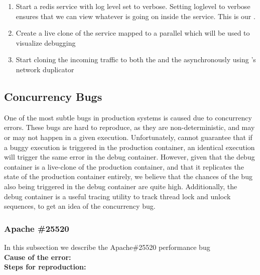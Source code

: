 \begin{adjustwidth}{0.5cm}{}
	\begin{enumerate}
		\item Start a redis service with log level set to verbose. Setting loglevel to verbose ensures that we can view whatever is going on inside the service. This is our \productioncontainer.
		\item Create a live clone of the service mapped to a parallel \debugcontainer which will be used to visualize debugging
		\item Start cloning the incoming traffic to both the \productioncontainer and the \debugcontainer asynchronously using \parikshan's network duplicator
	\end{enumerate}
\end{adjustwidth}



\subsection{Concurrency Bugs}
One of the most subtle bugs in production systems is caused due to concurrency errors.
These bugs are hard to reproduce, as they are non-deterministic, and may or may not happen in a given execution.
Unfortunately, \parikshan cannot guarantee that if a buggy execution is triggered in the production container, an identical execution will trigger the same error in the debug container.
However, given that the debug container is a live-clone of the production container, and that it replicates the state of the production container entirely, we believe that the chances of the bug also being triggered in the debug container are quite high.
Additionally, the debug container is a useful tracing utility to track thread lock and unlock sequences, to get an idea of the concurrency bug.

\subsubsection{Apache \#25520}

In this subsection we describe the Apache\#25520 performance bug \\

\noindent \textbf{Cause of the error:} \\

\noindent \textbf{Steps for reproduction:} \\

